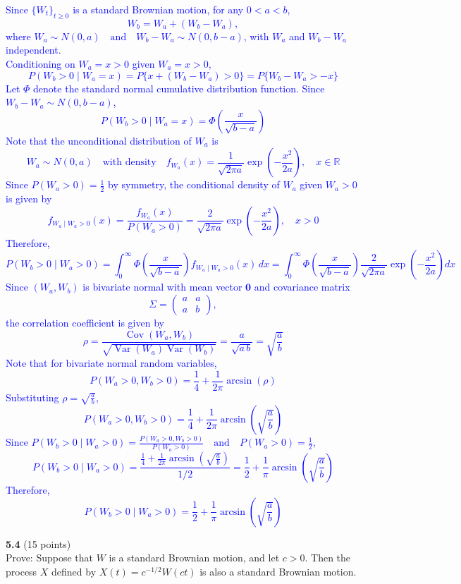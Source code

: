 \documentclass{article}
\begin{document}
\textcolor{blue}{
    Since $\{W_t\}_{t\ge0}$ is a standard Brownian motion, for any $0<a<b$,
\[
W_b = W_a + (W_b-W_a),
\]
where $W_a \sim N(0,a) \quad \text{and} \quad W_b-W_a \sim N(0,b-a)$,
with $W_a$ and $W_b-W_a$ independent. \\
\noindent Conditioning on $W_a=x>0$ given $W_a=x>0$,
\[
P(W_b>0 \mid W_a=x) = P\{x+(W_b-W_a)>0\} = P\{W_b-W_a > -x\}
\]
Let $\Phi$ denote the standard normal cumulative distribution function. Since $W_b-W_a \sim N(0,b-a)$,
\[
P(W_b>0 \mid W_a=x) = \Phi\left(\frac{x}{\sqrt{b-a}}\right)
\]
Note that the unconditional distribution of $W_a$ is 
\[
W_a\sim N(0,a) \quad \text{with density} \quad f_{W_a}(x)=\frac{1}{\sqrt{2\pi a}} \exp\left(-\frac{x^2}{2a}\right), \quad x\in \mathbb{R}
\]
Since $P(W_a>0)=\frac{1}{2}$ by symmetry, the conditional density of $W_a$ given $W_a>0$ is given by
\[
f_{W_a\mid W_a>0}(x) = \frac{f_{W_a}(x)}{P(W_a>0)}
= \frac{2}{\sqrt{2\pi a}} \exp\left(-\frac{x^2}{2a}\right), \quad x>0
\]
Therefore,
\[
P(W_b>0 \mid W_a>0) = \int_{0}^{\infty} \Phi\left(\frac{x}{\sqrt{b-a}}\right) f_{W_a\mid W_a>0}(x)\,dx = \int_{0}^{\infty} \Phi\left(\frac{x}{\sqrt{b-a}}\right) \frac{2}{\sqrt{2\pi a}} \exp\left(-\frac{x^2}{2a}\right) dx
\]
Since $(W_a,W_b)$ is bivariate normal with mean vector $\mathbf{0}$ and covariance matrix
\[
\Sigma = \begin{pmatrix} a & a \\ a & b \end{pmatrix},
\]
the correlation coefficient is given by 
\[
\rho = \frac{\operatorname{Cov}(W_a,W_b)}{\sqrt{\operatorname{Var}(W_a)\operatorname{Var}(W_b)}} = \frac{a}{\sqrt{a\,b}} = \sqrt{\frac{a}{b}}
\]
Note that for bivariate normal random variables,
\[
P(W_a>0, W_b>0) = \frac{1}{4} + \frac{1}{2\pi}\arcsin(\rho)
\]
Substituting $\rho = \sqrt{\frac{a}{b}}$,
\[
P(W_a>0, W_b>0) = \frac{1}{4} + \frac{1}{2\pi}\arcsin\left(\sqrt{\frac{a}{b}}\right)
\]
Since
$P(W_b>0\mid W_a>0) = \frac{P(W_a>0, W_b>0)}{P(W_a>0)} \quad \text{and} \quad P(W_a>0)=\frac{1}{2}$,
\[
P(W_b>0\mid W_a>0) = \frac{\frac{1}{4} + \frac{1}{2\pi}\arcsin\left(\sqrt{\frac{a}{b}}\right)}{1/2} = \frac{1}{2} + \frac{1}{\pi}\arcsin\left(\sqrt{\frac{a}{b}}\right)
\]
Therefore, $$P(W_b>0\mid W_a>0) = \frac{1}{2} + \frac{1}{\pi}\arcsin\left(\sqrt{\frac{a}{b}}\right)$$}

\noindent \textbf{5.4} (15 points) \\ Prove: Suppose that $W$ is a standard Brownian motion, and let $c > 0$. Then the process $X$ defined by $X(t) = c^{-1/2} W(ct)$ is also a standard Brownian motion.
\end{document}

